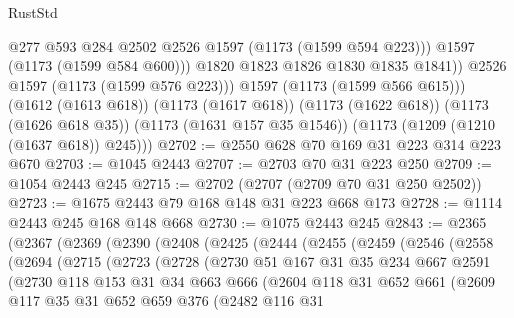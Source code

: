 \begin{lexlean}{RustStd}
\begin{coremodule}
                  @277
                  @593
                  @284
                  @2502
                  @2526
                  @1597
                  (@1173 (@1599 @594 @223)))
                @1597
                (@1173 (@1599 @584 @600)))
              @1820
              @1823
              @1826
              @1830
              @1835
              @1841))
          @2526
          @1597
          (@1173 (@1599 @576 @223)))
        @1597
        (@1173 (@1599 @566 @615)))
      (@1612 (@1613 @618))
      (@1173 (@1617 @618))
      (@1173 (@1622 @618))
      (@1173 (@1626 @618 @35))
      (@1173 (@1631 @157 @35 @1546))
      (@1173 (@1209 (@1210 (@1637 @618)) @245)))
@2702 := @2550 @628 @70 @169 @31 @223 @314 @223 @670
@2703 := @1045 @2443
@2707 := @2703 @70 @31 @223 @250
@2709 := @1054 @2443 @245
@2715 := @2702 (@2707 (@2709 @70 @31 @250 @2502))
@2723 := @1675 @2443 @79 @168 @148 @31 @223 @668 @173
@2728 := @1114 @2443 @245 @168 @148 @668
@2730 := @1075 @2443 @245
@2843 := @2365
    (@2367
      (@2369
        (@2390
          (@2408
            (@2425
              (@2444
                (@2455
                  (@2459
                    (@2546
                      (@2558
                        (@2694
                          (@2715
                            (@2723
                              (@2728
                                (@2730
                                  @51
                                  @167
                                  @31
                                  @35
                                  @234
                                  @667
                                  @2591
                                  (@2730
                                    @118
                                    @153
                                    @31
                                    @34
                                    @663
                                    @666
                                    (@2604
                                      @118
                                      @31
                                      @652
                                      @661
                                      (@2609
                                        @117
                                        @35
                                        @31
                                        @652
                                        @659
                                        @376
                                        (@2482
                                          @116
                                          @31

\end{coremodule}
\end{lexlean}
